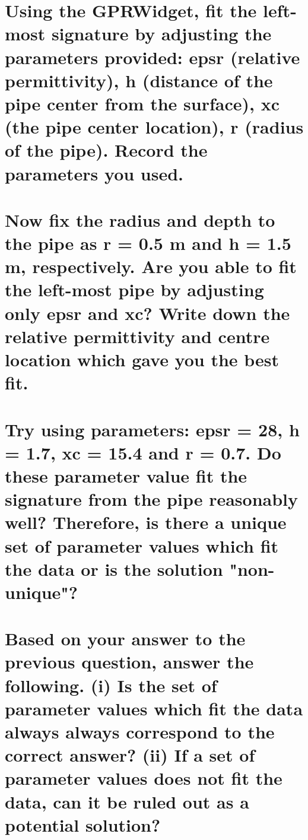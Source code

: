 \documentclass[twosides]{EOSC350Lab} %
\begin{document}
	\part{Using the GPRWidget, fit the left-most signature by adjusting the parameters provided: epsr (relative permittivity), h (distance of the pipe center from the surface), xc (the pipe center location), r (radius of the pipe). Record the parameters you used.
		}

			\vspace*{40pt}	


	\part{Now fix the radius and depth to the pipe as r = 0.5 m and h = 1.5 m, respectively. Are you able to fit the left-most pipe by adjusting only epsr and xc? Write down the relative permittivity and centre location which gave you the best fit.}



	\vspace{40pt}
		

	\part{Try using parameters: epsr = 28, h = 1.7, xc = 15.4 and r = 0.7. Do these parameter value fit the signature from the pipe reasonably well? Therefore, is there a unique set of parameter values which fit the data or is the solution "non-unique"?}



	\vspace{40pt}




\part{Based on your answer to the previous question, answer the following. (i) Is the set of parameter values which fit the data always always correspond to the correct answer? (ii) If a set of parameter values does not fit the data, can it be ruled out as a potential solution?}



	\vspace{40pt}
\end{document}
